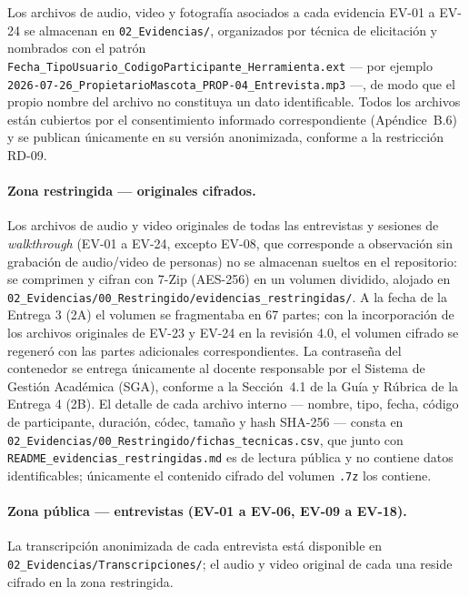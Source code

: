 \documentclass[journal,onecolumn]{IEEEtran}
\begin{document}
	Los archivos de audio, video y fotografía asociados a cada evidencia EV-01 a
	EV-24 se almacenan en \texttt{02\_Evidencias/}, organizados por técnica de
	elicitación y nombrados con el patrón
	\texttt{Fecha\_TipoUsuario\_CodigoParticipante\_Herramienta.ext} --- por
	ejemplo \texttt{2026-07-26\_PropietarioMascota\_PROP-04\_Entrevista.mp3} ---,
	de modo que el propio nombre del archivo no constituya un dato identificable. Todos
	los archivos están cubiertos por el consentimiento informado correspondiente
	(Apéndice~B.6) y se publican únicamente en su versión anonimizada, conforme
	a la restricción RD-09.
	
	\paragraph{Zona restringida --- originales cifrados.}
	Los archivos de audio y video originales de todas las entrevistas y sesiones
	de \emph{walkthrough} (EV-01 a EV-24, excepto EV-08, que corresponde a
	observación sin grabación de audio/video de personas) no se almacenan
	sueltos en el repositorio: se comprimen y cifran con 7-Zip (AES-256) en un
	volumen dividido, alojado en
	\texttt{02\_Evidencias/00\_Restringido/evidencias\_restringidas/}. A la
	fecha de la Entrega 3 (2A) el volumen se fragmentaba en 67 partes; con la
	incorporación de los archivos originales de EV-23 y EV-24 en la revisión
	4.0, el volumen cifrado se regeneró con las partes adicionales
	correspondientes. La contraseña del
	contenedor se entrega únicamente al docente responsable por el Sistema de
	Gestión Académica (SGA), conforme a la Sección~4.1 de la Guía y Rúbrica de
	la Entrega 4 (2B). El detalle de cada archivo interno --- nombre, tipo,
	fecha, código de participante, duración, códec, tamaño y hash SHA-256 ---
	consta en \texttt{02\_Evidencias/00\_Restringido/fichas\_tecnicas.csv}, que
	junto con \texttt{README\_evidencias\_restringidas.md} es de lectura
	pública y no contiene datos identificables; únicamente el contenido cifrado
	del volumen \texttt{.7z} los contiene.
	
	\paragraph{Zona pública --- entrevistas (EV-01 a EV-06, EV-09 a EV-18).}
	La transcripción anonimizada de cada entrevista está disponible en
	\texttt{02\_Evidencias/Transcripciones/}; el audio y video original de cada
	una reside cifrado en la zona restringida.
	
\end{document}
